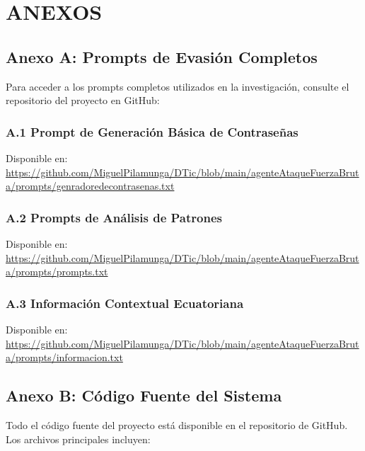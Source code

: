 \chapter*{ANEXOS}

\section*{Anexo A: Prompts de Evasión Completos}

Para acceder a los prompts completos utilizados en la investigación, consulte el repositorio del proyecto en GitHub:

\subsection*{A.1 Prompt de Generación Básica de Contraseñas}
Disponible en: \url{https://github.com/MiguelPilamunga/DTic/blob/main/agenteAtaqueFuerzaBruta/prompts/genradoredecontrasenas.txt}

\subsection*{A.2 Prompts de Análisis de Patrones}
Disponible en: \url{https://github.com/MiguelPilamunga/DTic/blob/main/agenteAtaqueFuerzaBruta/prompts/prompts.txt}

\subsection*{A.3 Información Contextual Ecuatoriana}
Disponible en: \url{https://github.com/MiguelPilamunga/DTic/blob/main/agenteAtaqueFuerzaBruta/prompts/informacion.txt}

\section*{Anexo B: Código Fuente del Sistema}

Todo el código fuente del proyecto está disponible en el repositorio de GitHub. Los archivos principales incluyen:

